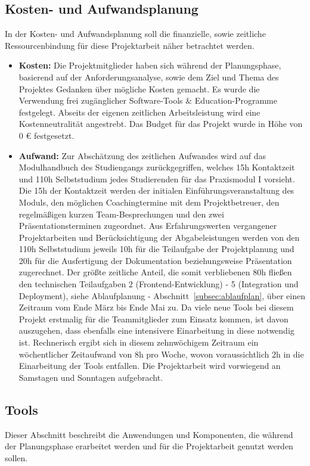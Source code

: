 \subsection{Kosten- und Aufwandsplanung}\label{subsec:Kosten-Aufwandsplanung}
In der Kosten- und Aufwandsplanung soll die finanzielle, sowie zeitliche Ressourcenbindung für diese Projektarbeit näher betrachtet werden.
\begin{itemize}[itemsep=1em, leftmargin=*]
    \item\textbf{Kosten:} Die Projektmitglieder haben sich während der Planungsphase, basierend auf der Anforderungsanalyse, sowie dem Ziel und Thema des Projektes Gedanken über mögliche Kosten gemacht.
    Es wurde die Verwendung frei zugänglicher Software-Tools \& Education-Programme festgelegt.
    Abseits der eigenen zeitlichen Arbeitsleistung wird eine Kostenneutralität angestrebt.
    Das Budget für das Projekt wurde in Höhe von 0 € festgesetzt.

    \item\textbf{Aufwand:} Zur Abschätzung des zeitlichen Aufwandes wird auf das Modulhandbuch des Studiengangs zurückgegriffen, welches 15h Kontaktzeit und 110h Selbststudium jedes Studierenden für das Praxismodul I vorsieht.
    Die 15h der Kontaktzeit werden der initialen Einführungsveranstaltung des Moduls, den möglichen Coachingtermine mit dem Projektbetreuer, den regelmäßigen kurzen Team-Besprechungen und den zwei Präsentationsterminen zugeordnet.
    Aus Erfahrungswerten vergangener Projektarbeiten und Berücksichtigung der Abgabeleistungen werden von den 110h Selbststudium jeweils 10h für die Teilaufgabe der Projektplanung und 20h für die Ausfertigung der Dokumentation beziehungsweise Präsentation zugerechnet.
    Der größte zeitliche Anteil, die somit verbliebenen 80h fließen den technischen Teilaufgaben 2 (Frontend-Entwicklung) - 5 (Integration und Deployment), siehe Ablaufplanung - Abschnitt~\ref{subsec:ablaufplan}, über einen Zeitraum vom Ende März bis Ende Mai zu.
    Da viele neue Tools bei diesem Projekt erstmalig für die Teammitglieder zum Einsatz kommen, ist davon auszugehen, dass ebenfalls eine intensivere Einarbeitung in diese notwendig ist.
    Rechnerisch ergibt sich in diesem zehnwöchigem Zeitraum ein wöchentlicher Zeitaufwand von 8h pro Woche, wovon voraussichtlich 2h in die Einarbeitung der Tools entfallen.
    Die Projektarbeit wird vorwiegend an Samstagen und Sonntagen aufgebracht.
\end{itemize}

\subsection{Tools}\label{subsec:Tools}
Dieser Abschnitt beschreibt die Anwendungen und Komponenten, die während der Planungsphase erarbeitet werden und für die Projektarbeit genutzt werden sollen.


